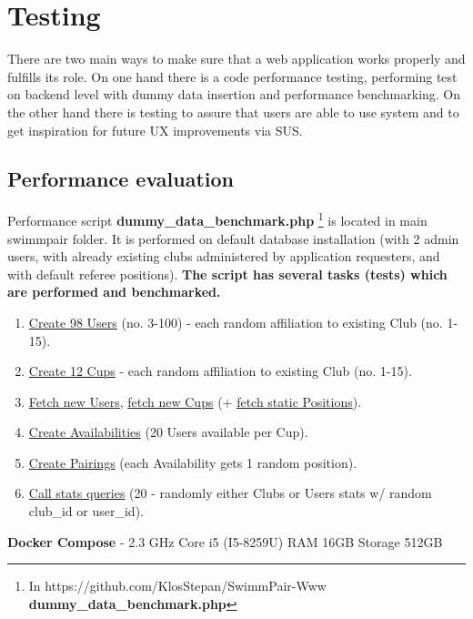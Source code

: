 \chapter{Testing}
There are two main ways to make sure that a web application works properly and fulfills its role. On one hand there is a code performance testing, performing test on backend level with dummy data insertion and performance benchmarking. On the other hand there is testing to assure that users are able to use system and to get inspiration for future UX improvements via SUS.
\section{Performance evaluation}
Performance script \textbf{dummy\_data\_benchmark.php} \footnote{In https://github.com/KlosStepan/SwimmPair-Www \textbf{dummy\_data\_benchmark.php}} is located in main swimmpair folder. It is performed on default database installation (with 2 admin users, with already existing clubs administered by application requesters, and with default referee positions).  
\newline
\textbf{The script has several tasks (tests) which are performed and benchmarked.}
\begin{enumerate}
    \item \underline{Create 98 Users} (no. 3-100) - each random affiliation to existing Club (no. 1-15).
    \item \underline{Create 12 Cups} - each random affiliation to existing Club (no. 1-15).
    \item \underline{Fetch new Users}, \underline{fetch new Cups} (+ \underline{fetch static Positions}).
    \item \underline{Create Availabilities} (20 Users available per Cup).
    \item \underline{Create Pairings} (each Availability gets 1 random position).
    \item \underline{Call stats queries} (20 - randomly either Clubs or Users stats w/ random club\_id or user\_id).
\end{enumerate}
\textbf{Docker Compose} - 2.3 GHz Core i5 (I5-8259U) RAM 16GB Storage 512GB
\newline
